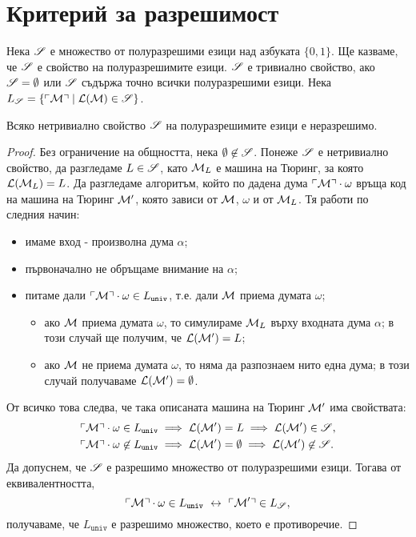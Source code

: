 \section{Критерий за разрешимост}

Нека $\mathscr{S}$ е множество от полуразрешими езици над азбуката $\{0,1\}$.
Ще казваме, че $\mathscr{S}$ е свойство на полуразрешимите езици.
$\mathscr{S}$ е тривиално свойство, ако $\mathscr{S} = \emptyset$ или $\mathscr{S}$ съдържа точно всички полуразрешими езици.
Нека $L_{\mathscr{S}} = \{\ulcorner{\mathcal{M}}\urcorner \mid \mathcal{L}(\mathcal{M}) \in \mathscr{S}\}$.

\begin{thm}
  Всяко нетривиално свойство $\mathscr{S}$ на полуразрешимите езици е неразрешимо.
\end{thm}
\begin{proof}
  Без ограничение на общността, нека $\emptyset \not\in \mathscr{S}$.
  Понеже $\mathscr{S}$ е нетривиално свойство, да разгледаме $L \in \mathscr{S}$,
  като $\mathcal{M}_L$ е машина на Тюринг, за която $\mathcal{L}(\mathcal{M}_L) = L$.
  Да разгледаме алгоритъм, който по дадена дума $\ulcorner{\mathcal{M}}\urcorner\cdot\omega$
  връща код на машина на Тюринг $\mathcal{M}'$, която зависи от $\mathcal{M}$, $\omega$ и от $\mathcal{M}_L$.
  Тя работи по следния начин:
  \begin{itemize}
  \item
    имаме вход - произволна дума $\alpha$;
  \item
    първоначално не обръщаме внимание на $\alpha$;
  \item
    питаме дали $\ulcorner{\mathcal{M}}\urcorner\cdot\omega \in L_{\texttt{univ}}$, т.е. дали $\mathcal{M}$ приема думата $\omega$;
    \begin{itemize}
    \item
      ако $\mathcal{M}$ приема думата $\omega$, то симулираме $\mathcal{M}_L$ върху входната дума $\alpha$;
      в този случай ще получим, че $\mathcal{L}(\mathcal{M}') = L$;
    \item
      ако $\mathcal{M}$ не приема думата $\omega$, то няма да разпознаем нито една дума;
      в този случай получаваме $\mathcal{L}(\mathcal{M}') = \emptyset$.      
    \end{itemize}
  \end{itemize}
  От всичко това следва, че така описаната машина на Тюринг $\mathcal{M}'$ има свойствата:
  \begin{align*}
    & \ulcorner{\mathcal{M}}\urcorner\cdot\omega \in L_{\texttt{univ}} \implies \mathcal{L}(\mathcal{M}') = L \implies \mathcal{L}(\mathcal{M}') \in \mathscr{S},\\
    & \ulcorner{\mathcal{M}}\urcorner\cdot\omega \not\in L_{\texttt{univ}} \implies \mathcal{L}(\mathcal{M}') = \emptyset \implies \mathcal{L}(\mathcal{M}') \not\in \mathscr{S}.
  \end{align*}
  Да допуснем, че $\mathscr{S}$ е разрешимо множество от полуразрешими езици.
  Тогава от еквивалентността,
  \[\ulcorner{\mathcal{M}}\urcorner\cdot\omega \in L_{\texttt{univ}} \ \leftrightarrow\  \ulcorner{\mathcal{M}'}\urcorner \in L_{\mathscr{S}},\]
  получаваме, че $L_{\texttt{univ}}$ е разрешимо множество, което е противоречие.
\end{proof}

